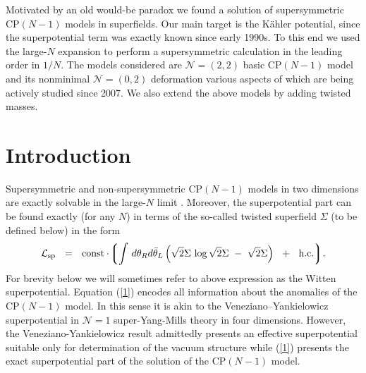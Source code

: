 \documentclass[epsfig,12pt]{article}
\def\beq{\begin{equation}}
\def\eeq{\end{equation}}
\newcommand{\lgr}{\left\lgroup}
\newcommand{\rgr}{\right\rgroup}
\begin{document}
\begin{titlepage}
\hspace{0.3cm}

	Motivated by an old would-be paradox we found a solution of supersymmetric CP$(N-1)$ models in superfields.
	Our main target is the  K\"ahler potential, since the superpotential term was exactly known since early 1990s.
	To this end we used the large-$N$ expansion to 
	perform a supersymmetric calculation in the leading order in $1/N$. 
	The models considered are ${\mathcal N}= (2,2)$ basic CP$(N-1)$ model and  its nonminimal ${\mathcal N}= (0,2)$ 
	deformation various aspects of which are being actively studied since 2007. 
	We also extend the above models by adding twisted masses.
\vspace{2cm}


\end{titlepage}


\section{Introduction}
\label{sec1}

	Supersymmetric and non-supersymmetric CP$(N-1)$ models in two dimensions are exactly solvable in the large-$N$ limit \cite{0,1p,SYhet}. 
	Moreover, the superpotential part can be found exactly (for any $N$) \cite{1,2,3} in terms of the so-called 
	twisted superfield $\Sigma$ (to be defined below) in the form
\beq
	{\mathcal L}_{\rm sp}    ~~=~~    \text{const} \cdot \!\lgr \int\, 
		d\theta_Rd\bar\theta_L \left( \sqrt{2}\Sigma\, \log \sqrt{2}\Sigma ~-~  
					      \sqrt{2}\Sigma \right) ~~+~~ \text{h.c.}\rgr\!.
\label{1}
\eeq
	For brevity below we will sometimes refer to above expression as the Witten superpotential.
	Equation (\ref{1})  encodes all information about the anomalies of the CP$(N-1)$ model. 
	In this sense it is akin to the Veneziano--Yankielowicz superpotential \cite{Veneziano} in ${\mathcal N}=1$ 
	super-Yang-Mills theory in four dimensions. 
	However, the Veneziano-Yankielowicz result admittedly presents an effective superpotential 
	suitable only for determination of the vacuum structure while (\ref{1}) presents the exact 
	superpotential part of the solution of the CP$(N-1)$ model.
\end{document}
